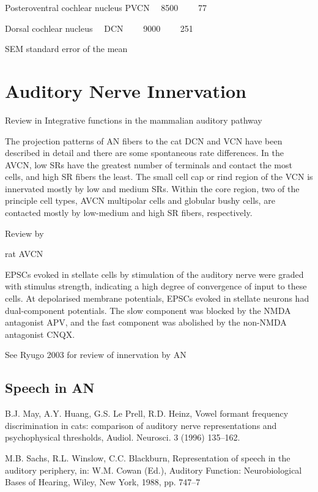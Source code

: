 \documentclass[10pt,a4paper]{article}
\begin{document}
Posteroventral cochlear nucleus PVCN \ \ 8500 \ \ \ \ 77

Dorsal cochlear nucleus \ \ DCN \ \ \ \ 9000 \ \ \ \ 251

SEM standard error of the mean

\section{Auditory Nerve Innervation }
\citep{SmithSpirou:2002} 
Review in Integrative functions in the mammalian auditory pathway

The projection patterns of AN fibers to the cat DCN and VCN have been described in detail \citep{FeketeRouillerEtAl:1984,Liberman:1991,Liberman:1993,RoullierCronin-SchreiberEtAl:1986,Ryugo:1992,RyugoParks:2003}
and there are some spontaneous rate differences.  In the AVCN, low SRs have the
greatest number of terminals and contact the most cells, and high SR fibers the
least.  The small cell cap or rind region of the VCN is innervated mostly by low
and medium SRs.  Within the core region, two of the principle cell types, AVCN
multipolar cells and globular bushy cells, are contacted mostly by low-medium
and high SR fibers, respectively.

Review by \citep{Parks:2000}

\citep{PerneyKaczmarek:1997}

\citep{IsaacsonWalmsley:1995} rat AVCN

EPSCs evoked in stellate cells by stimulation of the auditory nerve were graded
with stimulus strength, indicating a high degree of convergence of input to
these cells. At depolarised membrane potentials, EPSCs evoked in stellate
neurons had dual-component potentials.  The slow component was blocked by the
NMDA antagonist APV, and the fast component was abolished by the non-NMDA
antagonist CNQX.

See Ryugo 2003 for review of innervation by AN

\subsection{Speech in AN}
B.J. May, A.Y. Huang, G.S. Le Prell, R.D. Heinz, Vowel formant
frequency discrimination in cats: comparison of auditory nerve
representations and psychophysical thresholds, Audiol. Neurosci. 3
(1996) 135--162.

M.B. Sachs, R.L. Winslow, C.C. Blackburn, Representation of
speech in the auditory periphery, in: W.M. Cowan (Ed.), Auditory
Function: Neurobiological Bases of Hearing, Wiley, New York,
1988, pp. 747--7
\end{document}
